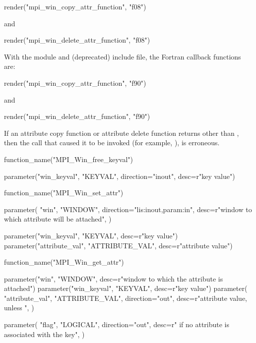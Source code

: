 \begin{mpi-binding}
    render("mpi_win_copy_attr_function", "f08")
\end{mpi-binding}
 
\noindent
and

\begin{mpi-binding}
    render("mpi_win_delete_attr_function", "f08")
\end{mpi-binding}

\noindent
With the  module and (deprecated)  include file, the Fortran callback functions are:

\begin{mpi-binding}
    render("mpi_win_copy_attr_function", "f90")
\end{mpi-binding}

\noindent
and

\begin{mpi-binding}
    render("mpi_win_delete_attr_function", "f90")
\end{mpi-binding}

If an attribute copy function or attribute delete function returns other than
, then the call that caused it to be invoked (for example,
), is erroneous.

\begin{mpi-binding}
    function_name("MPI_Win_free_keyval")
    
    parameter("win_keyval", "KEYVAL", direction="inout", desc=r"key value")
\end{mpi-binding}

%
\begin{mpi-binding}
    function_name("MPI_Win_set_attr")
    
    parameter(
        "win",
        "WINDOW",
        direction="lis:inout,param:in",
        desc=r"window to which attribute will be attached",
    )
    
    parameter("win_keyval", "KEYVAL", desc=r"key value")
    parameter("attribute_val", "ATTRIBUTE_VAL", desc=r"attribute value")
\end{mpi-binding}

%
\begin{mpi-binding}
    function_name("MPI_Win_get_attr")
    
    parameter("win", "WINDOW", desc=r"window to which the attribute is attached")
    parameter("win_keyval", "KEYVAL", desc=r"key value")
    parameter(
        "attribute_val",
        "ATTRIBUTE_VAL",
        direction="out",
        desc=r"attribute value, unless ",
    )
    
    parameter(
        "flag",
        "LOGICAL",
        direction="out",
        desc=r" if no attribute is associated with the key",
    )
\end{mpi-binding}

